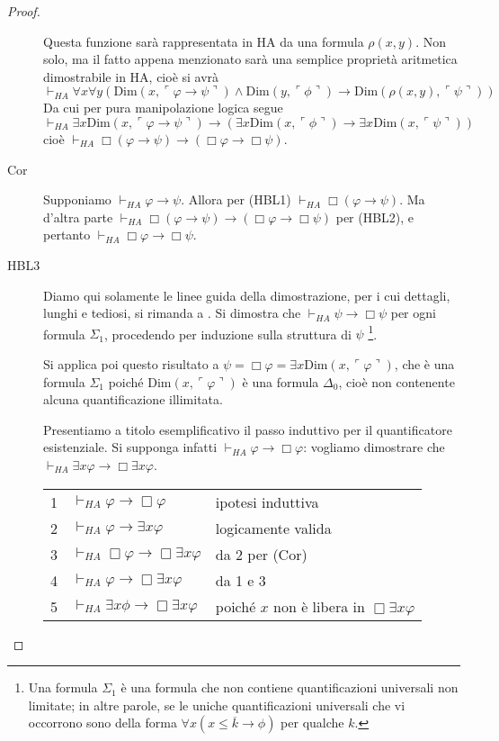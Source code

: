 \begin{proof}
\begin{description}
    Questa funzione sarà rappresentata in HA da una formula $\rho(x,y)$. Non solo, ma il fatto appena menzionato sarà una semplice proprietà aritmetica dimostrabile in HA, cioè si avrà
    $$\vdash_{HA}\forall x\forall y(\ensuremath{\mathrm{Dim}}(x,\ulcorner\varphi\to\psi\urcorner)\land\ensuremath{\mathrm{Dim}}(y,\ulcorner\phi\urcorner)\to \ensuremath{\mathrm{Dim}}(\rho(x,y),\ulcorner\psi\urcorner))$$
    Da cui per pura manipolazione logica segue
    $$\vdash_{HA}\exists x\ensuremath{\mathrm{Dim}}(x,\ulcorner\varphi\to\psi\urcorner)\to(\exists x\ensuremath{\mathrm{Dim}}(x,\ulcorner\phi\urcorner)\to \exists x\ensuremath{\mathrm{Dim}}(x,\ulcorner\psi\urcorner))$$
    cioè $\vdash_{HA}\Box(\varphi\to\psi)\to(\Box\varphi\to\Box\psi)$.
\item[Cor] Supponiamo $\vdash_{HA}\varphi\to\psi$. Allora per (HBL1) $\vdash_{HA}\Box(\varphi\to\psi)$. Ma d'altra parte $\vdash_{HA}\Box(\varphi\to\psi)\to(\Box\varphi\to\Box\psi)$ per (HBL2), e pertanto $\vdash_{HA}\Box\varphi\to\Box\psi$.
\item[HBL3] Diamo qui solamente le linee guida della dimostrazione, per i cui dettagli, lunghi e tediosi, si rimanda a \cite{Boolos}. Si dimostra che $\vdash_{HA}\psi\to\Box\psi$ per ogni formula $\Sigma_1$, procedendo per induzione sulla struttura di $\psi$ \footnote{Una formula $\Sigma_1$ è una formula che non contiene quantificazioni universali non limitate; in altre parole, se le uniche quantificazioni universali che vi occorrono sono della forma $\forall x(x\le\overline k\to\phi)$ per qualche $k$.}.

    Si applica poi questo risultato a $\psi=\Box\varphi=\exists x\ensuremath{\mathrm{Dim}}(x,\ulcorner\varphi\urcorner)$, che è una formula $\Sigma_1$ poiché $\ensuremath{\mathrm{Dim}}(x,\ulcorner\varphi\urcorner)$ è una formula $\Delta_0$, cioè non contenente alcuna quantificazione illimitata.

    Presentiamo a titolo esemplificativo il passo induttivo per il quantificatore esistenziale. Si supponga infatti $\vdash_{HA}\varphi\to\Box\varphi$: vogliamo dimostrare che $\vdash_{HA}\exists x\varphi\to\Box\exists x\varphi$.\\

    \begin{tabular}{l l l}
    1   &   $\vdash_{HA}\varphi\to\Box\varphi$                    & ipotesi induttiva     \\
    2   &   $\vdash_{HA}\varphi\to\exists x\varphi$                 & logicamente valida    \\
    3   &   $\vdash_{HA}\Box\varphi\to\Box\exists x\varphi$       & da 2 per (Cor)        \\
    4   &   $\vdash_{HA}\varphi\to\Box\exists x\varphi$           & da 1 e 3              \\
    5   &   $\vdash_{HA}\exists x\phi\to\Box\exists x\varphi$      & poiché $x$ non è libera in $\Box\exists x\varphi$\\
    \end{tabular}
\end{description}
\end{proof}


